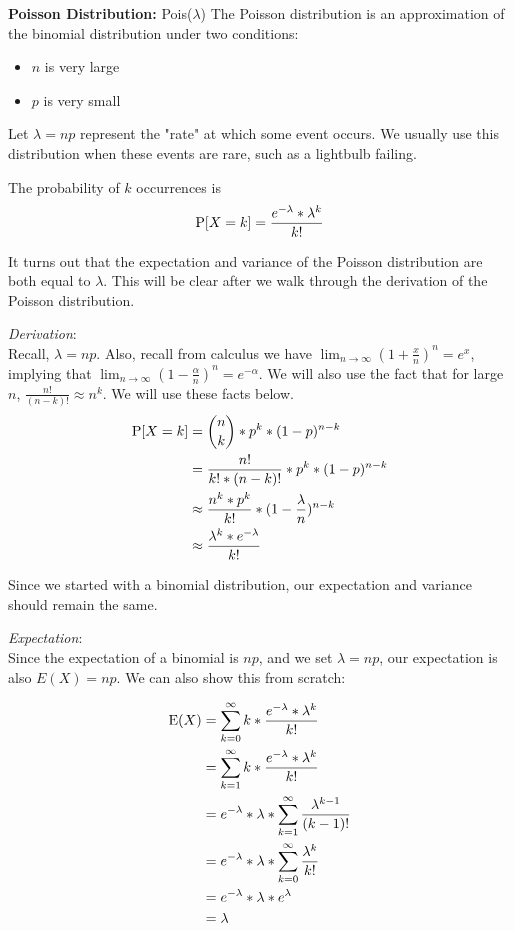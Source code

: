 \vspace{2 mm}
\textbf{Poisson Distribution:} Pois($\lambda$)
The Poisson distribution is an approximation of the binomial distribution under two conditions:
\begin{itemize}
	\item{$n$ is very large}
	\item{$p$ is very small}
\end{itemize}

Let $\lambda = np$ represent the "rate" at which some event occurs. We usually use this distribution when these events are rare, such as a lightbulb failing. 

The probability of $k$ occurrences is 
$$ \P[X = k] = \frac{e^{-\lambda} * \lambda^k}{k!} $$

It turns out that the expectation and variance of the Poisson distribution are both equal to $\lambda$. This will be clear after we walk through the derivation of the Poisson distribution.

\textit{Derivation}: \\
Recall, $\lambda = np$. Also, recall from calculus we have $\lim_{n \rightarrow \infty} \left(1 + \frac{x}{n}\right)^n = e^x$, implying that $\lim_{n \rightarrow \infty} \left(1 -\frac{\alpha}{n}\right)^n = e^{- \alpha}$. We will also use the fact that for large $n$, $\frac{n!}{(n-k)!} \approx n^k$. We will use these facts below.
\begin{align}
\P[X = k] &= {n \choose k} * p^k * (1 - p)^{n - k} \\ 
&= \frac{n!}{k! * (n - k)!} * p^k * (1 - p)^{n - k} \\
&\approx \frac{n^k * p^k}{k!} * (1 - \frac{\lambda}{n})^{n-k} \\
&\approx \frac{\lambda^k * e^{-\lambda}}{k!}
\end{align}

Since we started with a binomial distribution, our expectation and variance should remain the same.

\textit{Expectation}: \\
Since the expectation of a binomial is $np$, and we set $\lambda = np$, our expectation is also $E(X) = np$. We can also show this from scratch:

\begin{align*}
\E(X) &= \sum_{k = 0}^{\infty} k* \frac{e^{-\lambda} * \lambda^k}{k!} \\ \nonumber
&= \sum_{k = 1}^{\infty}k * \frac{e^{-\lambda} * \lambda^k}{k!} \\
&= e^{-\lambda} * \lambda * \sum_{k = 1}^{\infty} \frac{\lambda^{k - 1}}{(k - 1)!} \\
&=  e^{-\lambda} * \lambda * \sum_{k = 0}^{\infty} \frac{\lambda^{k}}{k!} \\
&= e^{-\lambda} * \lambda * e^{\lambda} \\
&= \lambda 
\end{align*}

